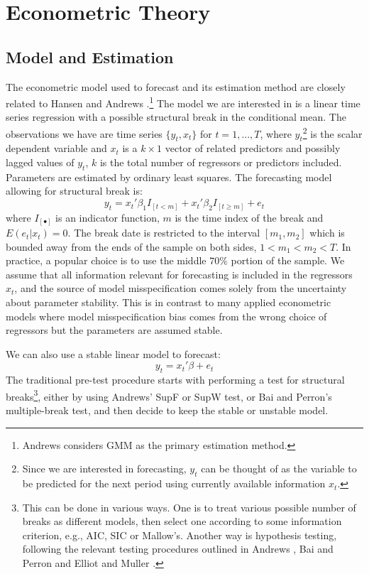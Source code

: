 \section{Econometric Theory}
\subsection{Model and Estimation}
The econometric model used to forecast and its estimation method are closely related to Hansen \cite{hansen2009averaging} and Andrews \cite{andrews93}.\footnote{Andrews considers GMM as the primary estimation method.} The model we are interested in is a linear time series regression with a possible structural break in the conditional mean. The observations we have are time series $\{y_t,x_t\}$ for $t = 1,...,T$, where $y_t$\footnote{Since we are interested in forecasting, $y_t$ can be thought of as the variable to be predicted for the next period using currently available information $x_t$.} is the scalar dependent variable and $x_t$ is a $k\times 1$ vector of related predictors and possibly lagged values of $y_t$, $k$ is the total number of regressors or predictors included. Parameters are estimated by ordinary least squares. The forecasting model allowing for structural break is:
\begin{equation} \label{mod:1}
	y_t = x_t'\beta_1 I_{[t<m]} + x_t'\beta_2 I_{[t \geq m]} + e_t
\end{equation}
where $I_{[\bullet]}$ is an indicator function, $m$ is the time index of the break and $E(e_t|x_t) = 0$. The break date is restricted to the interval $[m_1,m_2]$ which is bounded away from the ends of the sample on both sides, $1 < m_{1} < m_{2} < T$. In practice, a popular choice is to use the middle $70\%$ portion of the sample. We assume that all information relevant for forecasting is included in the regressors $x_t$, and the source of model misspecification comes solely from the uncertainty about parameter stability. This is in contrast to many applied econometric models where model misspecification bias comes from the wrong choice of regressors but the parameters are assumed stable.

We can also use a stable linear model to forecast:
\begin{equation} \label{mod:2}
	y_t = x_t'\beta + e_t
\end{equation}
The traditional pre-test procedure starts with performing a test for structural breaks\footnote{This can be done in various ways. One is to treat various possible number of breaks as different models, then select one according to some information criterion, e.g., AIC, SIC or Mallow's. Another way is hypothesis testing, following the relevant testing procedures outlined in Andrews \cite{andrews93}, Bai and Perron \cite{bai_perron98} and Elliot and Muller \cite{elliott_muller_RES2006}.}, either by using Andrews' SupF or SupW test, or Bai and Perron's multiple-break test, and then decide to keep the stable or unstable model.

